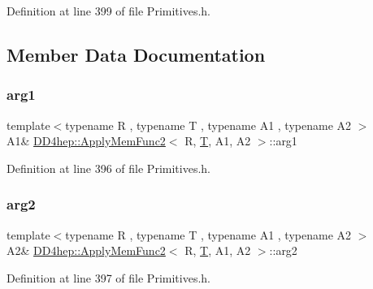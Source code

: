 Definition at line 399 of file Primitives.\+h.



\subsection{Member Data Documentation}
\hypertarget{struct_d_d4hep_1_1_apply_mem_func2_a07f0ada96e3eb80a5934f530c994b3c2}{}\label{struct_d_d4hep_1_1_apply_mem_func2_a07f0ada96e3eb80a5934f530c994b3c2} 
\subsubsection{\texorpdfstring{arg1}{arg1}}
{\footnotesize\ttfamily template$<$typename R , typename T , typename A1 , typename A2 $>$ \\
A1\& \hyperlink{struct_d_d4hep_1_1_apply_mem_func2}{D\+D4hep\+::\+Apply\+Mem\+Func2}$<$ R, \hyperlink{class_t}{T}, A1, A2 $>$\+::arg1}



Definition at line 396 of file Primitives.\+h.

\hypertarget{struct_d_d4hep_1_1_apply_mem_func2_a2c9f7dbd482c849c53ee6f499d6a0713}{}\label{struct_d_d4hep_1_1_apply_mem_func2_a2c9f7dbd482c849c53ee6f499d6a0713} 
\subsubsection{\texorpdfstring{arg2}{arg2}}
{\footnotesize\ttfamily template$<$typename R , typename T , typename A1 , typename A2 $>$ \\
A2\& \hyperlink{struct_d_d4hep_1_1_apply_mem_func2}{D\+D4hep\+::\+Apply\+Mem\+Func2}$<$ R, \hyperlink{class_t}{T}, A1, A2 $>$\+::arg2}



Definition at line 397 of file Primitives.\+h.

\hypertarget{struct_d_d4hep_1_1_apply_mem_func2_a7fc130521dd8099937693fdf25eaaaaf}{}\label{struct_d_d4hep_1_1_apply_mem_func2_a7fc130521dd8099937693fdf25eaaaaf} 

